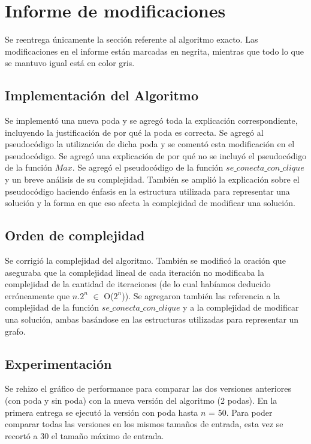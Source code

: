 \documentclass[10pt,a4paper]{article}
\begin{document}
\section*{Informe de modificaciones}

\par{Se reentrega únicamente la sección referente al algoritmo exacto. Las
modificaciones en el informe están marcadas en negrita, mientras que todo lo
que se mantuvo igual está en color gris.}

\subsection*{Implementación del Algoritmo}

\par{Se implementó una nueva poda y se agregó toda la explicación
correspondiente, incluyendo la justificación de por qué la poda es correcta.
Se agregó al pseudocódigo la utilización de dicha poda y se comentó esta
modificación en el pseudocódigo.
Se agregó una explicación de por qué no se incluyó el pseudocódigo de la
función $Max$. Se agregó el pseudocódigo de la función
$se\_conecta\_con\_clique$ y un breve análisis de su complejidad. También
se amplió la explicación sobre el pseudocódigo haciendo énfasis en la
estructura utilizada para representar una solución y la forma en que eso
afecta la complejidad de modificar una solución.}

\subsection*{Orden de complejidad}

\par{Se corrigió la complejidad del algoritmo. También se modificó la oración
que aseguraba que la complejidad lineal de cada iteración no modificaba la
complejidad de la cantidad de iteraciones (de lo cual habíamos deducido
erróneamente que $n.2^n$ $\in$ O($2^n$)). Se agregaron también las referencia
a la complejidad de la función $se\_conecta\_con\_clique$ y a la
complejidad de modificar una solución, ambas basándose en las estructuras
utilizadas para representar un grafo.}

\subsection*{Experimentación}

\par{Se rehizo el gráfico de performance para comparar las dos versiones
anteriores (con poda y sin poda) con la nueva versión del algoritmo (2 podas).
En la primera entrega se ejecutó la versión con poda hasta $n$ = 50. Para poder
comparar todas las versiones en los mismos tamaños de entrada, esta vez se
recortó a 30 el tamaño máximo de entrada.}\\
\end{document}
